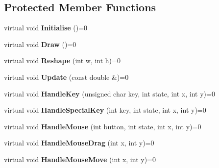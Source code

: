 \subsection*{Protected Member Functions}
\begin{DoxyCompactItemize}
\item 
virtual void {\bfseries Initialise} ()=0\hypertarget{class_engine_a43a803fae8d4672c9119763c438825ad}{}\label{class_engine_a43a803fae8d4672c9119763c438825ad}

\item 
virtual void {\bfseries Draw} ()=0\hypertarget{class_engine_abc33391595849f65f99eb5f145535b72}{}\label{class_engine_abc33391595849f65f99eb5f145535b72}

\item 
virtual void {\bfseries Reshape} (int w, int h)=0\hypertarget{class_engine_a8c958c38482fbc3e2dfc3d7f2515d2c1}{}\label{class_engine_a8c958c38482fbc3e2dfc3d7f2515d2c1}

\item 
virtual void {\bfseries Update} (const double \&)=0\hypertarget{class_engine_a258aff43face90f1a4911b2c30cb5c58}{}\label{class_engine_a258aff43face90f1a4911b2c30cb5c58}

\item 
virtual void {\bfseries Handle\+Key} (unsigned char key, int state, int x, int y)=0\hypertarget{class_engine_ae64af2ed4a8c6629a7aa7254a0fd892a}{}\label{class_engine_ae64af2ed4a8c6629a7aa7254a0fd892a}

\item 
virtual void {\bfseries Handle\+Special\+Key} (int key, int state, int x, int y)=0\hypertarget{class_engine_ade235e5c6e7b67660205143235b8b918}{}\label{class_engine_ade235e5c6e7b67660205143235b8b918}

\item 
virtual void {\bfseries Handle\+Mouse} (int button, int state, int x, int y)=0\hypertarget{class_engine_a26cd386d9286261e9aadbcf8082110ca}{}\label{class_engine_a26cd386d9286261e9aadbcf8082110ca}

\item 
virtual void {\bfseries Handle\+Mouse\+Drag} (int x, int y)=0\hypertarget{class_engine_a88faed8e9d03f3e734ba328c962c0d95}{}\label{class_engine_a88faed8e9d03f3e734ba328c962c0d95}

\item 
virtual void {\bfseries Handle\+Mouse\+Move} (int x, int y)=0\hypertarget{class_engine_aec49b2c8ad382a7ca5f5998fbe4d995b}{}\label{class_engine_aec49b2c8ad382a7ca5f5998fbe4d995b}

\end{DoxyCompactItemize}
